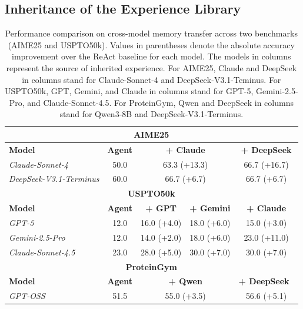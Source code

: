 \subsection{Inheritance of the Experience Library}
\begin{table}[!t]
\centering
\caption{Performance comparison on cross-model memory transfer across two benchmarks (AIME25 and USPTO50k). Values in parentheses denote the absolute accuracy improvement over the ReAct baseline for each model. The models in columns represent the source of inherited experience. For AIME25, Claude and DeepSeek in columns stand for Claude-Sonnet-4 and DeepSeek-V3.1-Teminus. For USPTO50k, GPT, Gemini, and Claude in columns stand for GPT-5, Gemini-2.5-Pro, and Claude-Sonnet-4.5. For ProteinGym, Qwen and DeepSeek in columns stand for Qwen3-8B and DeepSeek-V3.1-Terminus.}
\label{tab:memory_transfer}
\smallskip
\begin{tabular}{@{}lcccc@{}}
\toprule
\multicolumn{5}{c}{\textbf{AIME25}} \\
\midrule
\textbf{Model} & \textbf{Agent} & \multicolumn{2}{c}{\textbf{+ Claude}} & \textbf{+ DeepSeek} \\
\midrule
\textit{Claude-Sonnet-4} & 50.0 & \multicolumn{2}{c}{63.3 (\textcolor{blue!80}{+13.3})}  & 66.7 (\textcolor{blue!80}{+16.7}) \\
\textit{DeepSeek-V3.1-Terminus}  & 60.0  & \multicolumn{2}{c}{66.7 (\textcolor{blue!80}{+6.7})}  & 66.7 (\textcolor{blue!80}{+6.7}) \\
\midrule
\multicolumn{5}{c}{\textbf{USPTO50k}} \\
\midrule
 {\textbf{Model}} &  \textbf{Agent} &  {\textbf{+ GPT}} & {\textbf{+ Gemini}} &  {\textbf{+ Claude}} \\
\midrule
 {\textit{GPT-5}} &  {12.0} &  {16.0 (\textcolor{blue!80}{+4.0)} } &  18.0 (\textcolor{blue!80}{+6.0}) &  {15.0 (\textcolor{blue!80}{+3.0)} }\\
 {\textit{Gemini-2.5-Pro} } &  {12.0} &  {14.0 (\textcolor{blue!80}{+2.0)} } &  18.0 (\textcolor{blue!80}{+6.0})&  {23.0 (\textcolor{blue!80}{+11.0)} }\\
 {\textit{Claude-Sonnet-4.5} } &  {23.0} &  {28.0 (\textcolor{blue!80}{+5.0)} } &  30.0 (\textcolor{blue!80}{+7.0}) &  30.0 (\textcolor{blue!80}{+7.0)} \\
\midrule
\multicolumn{5}{c}{\textbf{ProteinGym}} \\
\midrule
\textbf{Model} & \textbf{Agent}& \multicolumn{2}{c}{\textbf{+ Qwen}} & \textbf{+ DeepSeek\quad\  }\\
\midrule
\textit{GPT-OSS} & {51.5} & \multicolumn{2}{c}{55.0 (\textcolor{blue!80}{+3.5})}  & 56.6 (\textcolor{blue!80}{+5.1})\\
\toprule
\end{tabular}%
\end{table}




